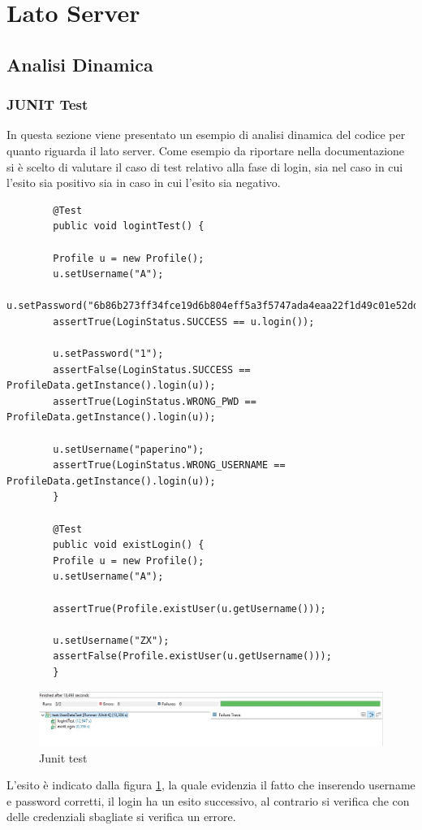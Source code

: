 \section{Lato Server}
	\subsection{Analisi Dinamica}
		\subsubsection{JUNIT Test}
		In questa sezione viene presentato un esempio di analisi dinamica del codice per quanto riguarda il lato server. Come esempio da riportare nella documentazione si è scelto di valutare il caso di test relativo alla fase di login, sia nel caso in cui l'esito sia positivo sia in caso in cui l'esito sia negativo.
		\begin{lstlisting}
		@Test
		public void logintTest() {
		
		Profile u = new Profile();
		u.setUsername("A");
		u.setPassword("6b86b273ff34fce19d6b804eff5a3f5747ada4eaa22f1d49c01e52ddb7875b4b");
		assertTrue(LoginStatus.SUCCESS == u.login());
		
		u.setPassword("1");
		assertFalse(LoginStatus.SUCCESS == ProfileData.getInstance().login(u));
		assertTrue(LoginStatus.WRONG_PWD == ProfileData.getInstance().login(u));
		
		u.setUsername("paperino");
		assertTrue(LoginStatus.WRONG_USERNAME == ProfileData.getInstance().login(u));
		}
		
		@Test
		public void existLogin() {
		Profile u = new Profile();
		u.setUsername("A");
		
		assertTrue(Profile.existUser(u.getUsername()));
		
		u.setUsername("ZX");
		assertFalse(Profile.existUser(u.getUsername()));
		}
		\end{lstlisting}
		\begin{figure}[h!]
			\centering
			\includegraphics[width=\textwidth]{Immagini/Test/Junit_login.jpg}
			\caption{Junit test}
			\label{fig:Junit_login}
		\end{figure}
		L'esito è indicato dalla figura \ref{fig:Junit_login}, la quale evidenzia il fatto che inserendo username e password corretti, il login ha un esito successivo, al contrario si verifica che con delle credenziali sbagliate si verifica un errore.
		
